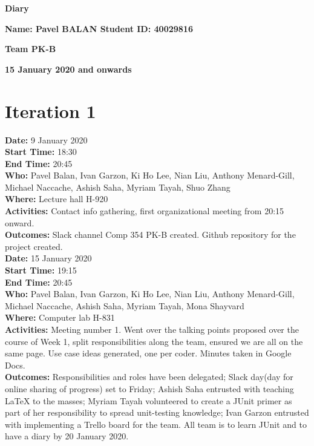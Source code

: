 \documentclass[12pt]{article}
\begin{document}
\vspace*{0.2in}
\centerline{\bf\Large Diary}

\vspace*{0.2in}
\centerline{\bf\Large Name: Pavel BALAN   Student ID: 40029816}

\vspace*{0.2in}
\centerline{\bf\Large Team PK-B}

\vspace*{0.2in}
\centerline{\bf\Large 15 January 2020 and onwards}

\section{Iteration 1}

{\bf Date:} 9 January 2020\\
{\bf Start Time:} 18:30\\
{\bf End Time:} 20:45 \\
{\bf Who:} Pavel Balan, Ivan Garzon, Ki Ho Lee, Nian Liu, Anthony Menard-Gill, Michael Naccache, Ashish Saha, Myriam Tayah, Shuo Zhang\\
{\bf Where:} Lecture hall H-920 \\
{\bf Activities:} Contact info gathering, first organizational meeting from 20:15 onward.\\
{\bf Outcomes:} Slack channel Comp 354 PK-B created. Github repository for the project created.\\

{\bf Date:} 15 January 2020\\
{\bf Start Time:} 19:15\\
{\bf End Time:} 20:45 \\
{\bf Who:} Pavel Balan, Ivan Garzon, Ki Ho Lee, Nian Liu, Anthony Menard-Gill, Michael Naccache, Ashish Saha, Myriam Tayah, Mona Shayvard\\
{\bf Where:} Computer lab H-831 \\
{\bf Activities:} Meeting number 1. Went over the talking points proposed over the course of Week 1, split responsibilities along the team, ensured we are all on the same page. Use case ideas generated, one per coder. Minutes taken in Google Docs.\\
{\bf Outcomes:} Responsibilities and roles have been delegated; Slack day(day for online sharing of progress) set to Friday; Ashish Saha entrusted with teaching LaTeX to the masses; Myriam Tayah volunteered to create a JUnit primer as part of her responsibility to spread unit-testing knowledge; Ivan Garzon entrusted with implementing a Trello board for the team. All team is to learn JUnit and to have a diary by 20 January 2020.\\
\end{document}
